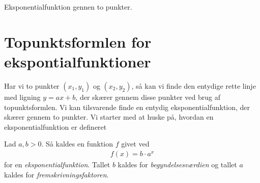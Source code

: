 
\begin{center}
\Huge
Eksponentialfunktion gennen to punkter. 
\end{center}
\section*{Topunktsformlen for ekspontialfunktioner}
Har vi to punkter $(x_1,y_1)$ og $(x_2,y_2)$, så kan vi finde den entydige rette linje med ligning $y = ax + b$, der skærer gennem disse punkter ved brug af topunktsformlen. 
Vi kan tilsvarende finde en entydig eksponentialfunktion, der skærer gennem to punkter.
Vi starter med at huske på, hvordan en eksponentialfunktion er defineret
\begin{defn}[Eksponentialfunktion]
	Lad $a,b>0$. Så kaldes en funktion $f$ givet ved
	\begin{align*}
		f(x)=b\cdot a^x
	\end{align*}
	for en \textit{eksponentialfunktion}. Tallet $b$ kaldes for \textit{begyndelsesværdien} og tallet $a$ kaldes for \textit{fremskrivningsfaktoren}.
\end{defn}


